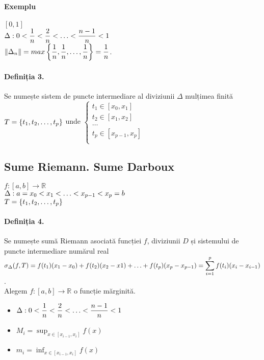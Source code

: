 \paragraph{Exemplu}
$[0, 1]$ \\
$\Delta: 0 < \displaystyle\frac{1}{n} < \displaystyle\frac{2}{n} < \mathellipsis < \displaystyle\frac{n-1}{n} < 1$ \\
$\Vert \Delta_{n} \Vert = max \left\{\displaystyle\frac{1}{n}, \displaystyle\frac{1}{n}, \mathellipsis, \displaystyle\frac{1}{n} \right\} = \displaystyle\frac{1}{n}$.

\paragraph{Definiția 3.}
Se numește sistem de puncte intermediare al diviziunii $\Delta$ mulțimea finită $T = \{ t_{1}, t_{2}, \mathellipsis, t_{p} \}$ unde 
$\left\{
    \begin{array}{l}
        t_{1} \in [x_{0}, x_{1}] \\
        t_{2} \in [x_{1}, x_{2}] \\
        \hdots \\
        t_{p} \in [x_{p-1}, x_{p}] \\
    \end{array}
\right.$

\subsection{Sume Riemann. Sume Darboux}
$f:[a,b] \rightarrow \mathbb{R}$ \\
$\Delta: a = x_{0} < x_{1} < \mathellipsis < x_{p-1} < x_{p} = b$ \\
$T = \{ t_{1}, t_{2}, \mathellipsis, t_{p} \}$

\paragraph{Definiția 4.}
Se numește sumă Riemann asociată funcției $f$, diviziunii $D$ și sistemului de puncte intermediare numărul real 
$\sigma_{\Delta}(f, T) = f(t_{1})(x_{1} - x_{0}) + f(t_{2})(x_{2}-x{1}) + \mathellipsis + f(t_{p})(x_{p} - x_{p-1}) = \displaystyle\sum_{i=1}^{p} f(t_{i})(x_{i}-x_{i-1})$. \\
Alegem $f:[a,b] \rightarrow \mathbb{R}$ o funcție mărginită. \\
\begin{itemize}
    \item $\Delta: 0 < \displaystyle\frac{1}{n} < \displaystyle\frac{2}{n} < \mathellipsis < \displaystyle\frac{n-1}{n} < 1$ \\
    \item $M_{i} = \displaystyle\sup_{x \in [x_{i-1}, x_{i}]} f(x)$
    \item $m_{i} = \displaystyle\inf_{x \in [x_{i-1}, x_{i}]} f(x)$
\end{itemize}

